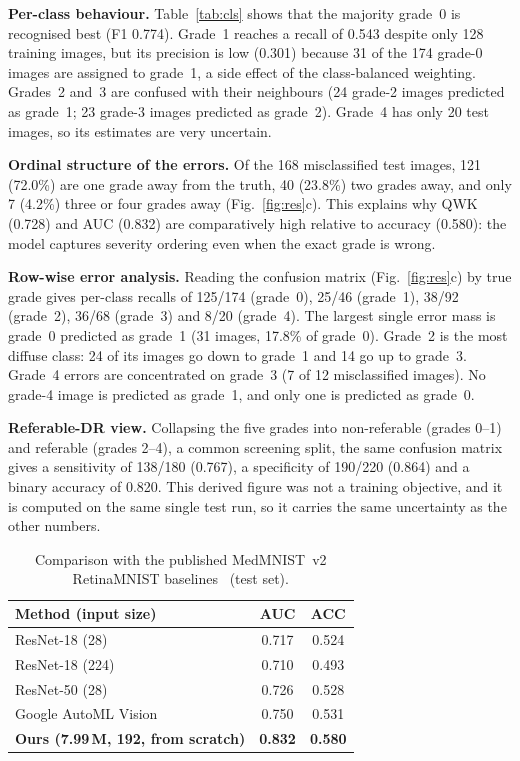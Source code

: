\documentclass[10pt,twocolumn]{article}
\begin{document}
\textbf{Per-class behaviour.} Table~\ref{tab:cls} shows that the majority grade~0 is recognised best (F1 0.774). Grade~1 reaches a recall of 0.543 despite only 128 training images, but its precision is low (0.301) because 31 of the 174 grade-0 images are assigned to grade~1, a side effect of the class-balanced weighting. Grades~2 and~3 are confused with their neighbours (24 grade-2 images predicted as grade~1; 23 grade-3 images predicted as grade~2). Grade~4 has only 20 test images, so its estimates are very uncertain.

\textbf{Ordinal structure of the errors.} Of the 168 misclassified test images, 121 (72.0\%) are one grade away from the truth, 40 (23.8\%) two grades away, and only 7 (4.2\%) three or four grades away (Fig.~\ref{fig:res}c). This explains why QWK (0.728) and AUC (0.832) are comparatively high relative to accuracy (0.580): the model captures severity ordering even when the exact grade is wrong.

\textbf{Row-wise error analysis.} Reading the confusion matrix (Fig.~\ref{fig:res}c) by true grade gives per-class recalls of 125/174 (grade~0), 25/46 (grade~1), 38/92 (grade~2), 36/68 (grade~3) and 8/20 (grade~4). The largest single error mass is grade~0 predicted as grade~1 (31 images, 17.8\% of grade~0). Grade~2 is the most diffuse class: 24 of its images go down to grade~1 and 14 go up to grade~3. Grade~4 errors are concentrated on grade~3 (7 of 12 misclassified images). No grade-4 image is predicted as grade~1, and only one is predicted as grade~0.

\textbf{Referable-DR view.} Collapsing the five grades into non-referable (grades 0--1) and referable (grades 2--4), a common screening split, the same confusion matrix gives a sensitivity of 138/180 (0.767), a specificity of 190/220 (0.864) and a binary accuracy of 0.820. This derived figure was not a training objective, and it is computed on the same single test run, so it carries the same uncertainty as the other numbers.

\begin{table}[t]
\centering\footnotesize
\caption{Comparison with the published MedMNIST~v2 RetinaMNIST baselines~\cite{medmnistv2} (test set).}\label{tab:cmp}
\begin{tabular}{lcc}
\toprule
Method (input size) & AUC & ACC\\
\midrule
ResNet-18 (28)       & 0.717 & 0.524\\
ResNet-18 (224)      & 0.710 & 0.493\\
ResNet-50 (28)       & 0.726 & 0.528\\
Google AutoML Vision & 0.750 & 0.531\\
\midrule
\textbf{Ours (7.99\,M, 192, from scratch)} & \textbf{0.832} & \textbf{0.580}\\
\bottomrule
\end{tabular}
\end{table}
\end{document}
